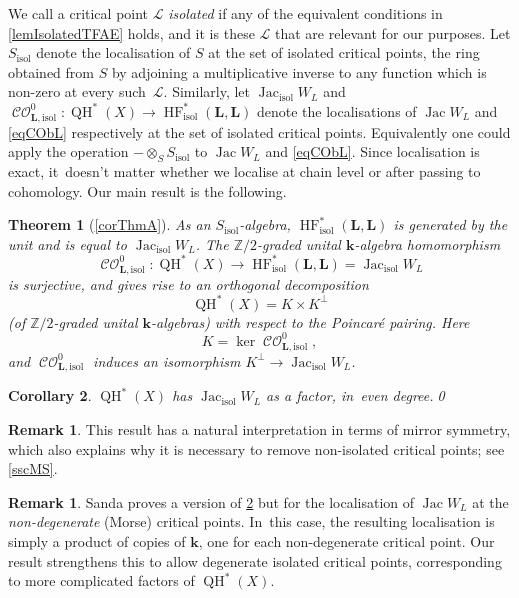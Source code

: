 \documentclass[JEP,XML,SOM,Unicode,NoEqCountersInSection,NoFloatCountersInSection,published]{cedram}
\newtheorem{mainthm}{Theorem}
\newtheorem{maincor}[mainthm]{Corollary}
\theoremstyle{definition}
\newtheorem{remark}[theorem]{Remark}
\newcommand{\ZZ}{\mathbb{Z}}
\newcommand{\calL}{\mathcal{L}}
\newcommand{\kk}{{\boldsymbol{k}}}
\newcommand{\bL}{{\boldsymbol{L}}}
\newcommand{\isol}{\mathrm{isol}}
\newcommand{\HF}{\operatorname{HF}}
\newcommand{\CO}{\operatorname{\mathcal{CO}}}
\newcommand{\QH}{\operatorname{QH}}
\newcommand{\Jac}{\operatorname{Jac}}
\newcommand{\Jacisol}{\operatorname{Jac}_\isol}
\begin{document}
We call a critical point $\calL$ \emph{isolated} if any of the equivalent conditions in \cref{lemIsolatedTFAE} holds, and it is these $\calL$ that are relevant for our purposes. Let $S_\isol$ denote the localisation of $S$ at the set of isolated critical points, \ie the ring obtained from $S$ by adjoining a multiplicative inverse to any function which is non-zero at every such~$\calL$. Similarly, let $\Jacisol W_L$ and $\CO^0_{\bL, \isol} : \QH^*(X) \to \HF^*_\isol(\bL, \bL)$ denote the localisations of $\Jac W_L$ and \eqref{eqCObL} respectively at the set of isolated critical points. Equivalently one could apply the operation ${-} \otimes_S S_\isol$ to $\Jac W_L$ and \eqref{eqCObL}. Since localisation is exact, it~doesn't matter whether we localise at chain level or after passing to cohomology. Our main result is the following.

\begin{mainthm}[\cref{corThmA}]
\label{TheoremA}
As an $S_\isol$-algebra, $\HF^*_\isol(\bL, \bL)$ is generated by the unit and is equal to $\Jacisol W_L$. The $\ZZ/2$-graded unital $\kk$-algebra homomorphism
\[
\CO^0_{\bL, \isol} : \QH^*(X) \to \HF^*_\isol(\bL, \bL) = \Jacisol W_L
\]
is surjective, and gives rise to an orthogonal decomposition
\[
\QH^*(X) = K \times K^\perp
\]
(of $\ZZ/2$-graded unital $\kk$-algebras) with respect to the Poincaré pairing. Here
\[
K = \ker \CO^0_{\bL, \isol},
\]
and $\CO^0_{\bL, \isol}$ induces an isomorphism $K^\perp \to \Jacisol W_L$.
\end{mainthm}

\begin{maincor}
\label{CorollaryB}
$\QH^*(X)$ has $\Jacisol W_L$ as a factor, in~even degree.\qed
\end{maincor}

\begin{remark}
This result has a natural interpretation in terms of mirror symmetry, which also explains why it is necessary to remove non-isolated critical points; see \cref{sscMS}.
\end{remark}

\begin{remark}
Sanda \cite[\S 5.1]{Sanda} proves a version of \cref{CorollaryB} but for the localisation of $\Jac W_L$ at the \emph{non-degenerate} (\ie Morse) critical points. In~this case, the resulting localisation is simply a product of copies of $\kk$, one for each non-degenerate critical point. Our result strengthens this to allow degenerate isolated critical points, corresponding to more complicated factors of $\QH^*(X)$.
\end{remark}
\end{document}
